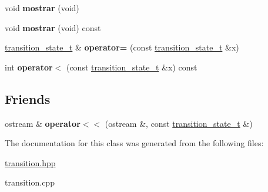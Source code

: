 \begin{DoxyCompactItemize}
\item 
\hypertarget{classtransition__state__t_a08d7ac07bc360c4f5d1c777297d23043}{}\label{classtransition__state__t_a08d7ac07bc360c4f5d1c777297d23043} 
void {\bfseries mostrar} (void)
\item 
\hypertarget{classtransition__state__t_a5bb3f9a0b8cce580fa05e0a1942de7aa}{}\label{classtransition__state__t_a5bb3f9a0b8cce580fa05e0a1942de7aa} 
void {\bfseries mostrar} (void) const
\item 
\hypertarget{classtransition__state__t_aeee7ba5ff30b64bf1f63c268a9a77292}{}\label{classtransition__state__t_aeee7ba5ff30b64bf1f63c268a9a77292} 
\hyperlink{classtransition__state__t}{transition\+\_\+state\+\_\+t} \& {\bfseries operator=} (const \hyperlink{classtransition__state__t}{transition\+\_\+state\+\_\+t} \&x)
\item 
\hypertarget{classtransition__state__t_acd7b3efa1163808f5413b892950f4b5c}{}\label{classtransition__state__t_acd7b3efa1163808f5413b892950f4b5c} 
int {\bfseries operator$<$} (const \hyperlink{classtransition__state__t}{transition\+\_\+state\+\_\+t} \&x) const
\end{DoxyCompactItemize}
\subsection*{Friends}
\begin{DoxyCompactItemize}
\item 
\hypertarget{classtransition__state__t_af3353b20817bac28bd35d5ce6ce33d62}{}\label{classtransition__state__t_af3353b20817bac28bd35d5ce6ce33d62} 
ostream \& {\bfseries operator$<$$<$} (ostream \&, const \hyperlink{classtransition__state__t}{transition\+\_\+state\+\_\+t} \&)
\end{DoxyCompactItemize}


The documentation for this class was generated from the following files\+:\begin{DoxyCompactItemize}
\item 
\hyperlink{transition_8hpp}{transition.\+hpp}\item 
transition.\+cpp\end{DoxyCompactItemize}
